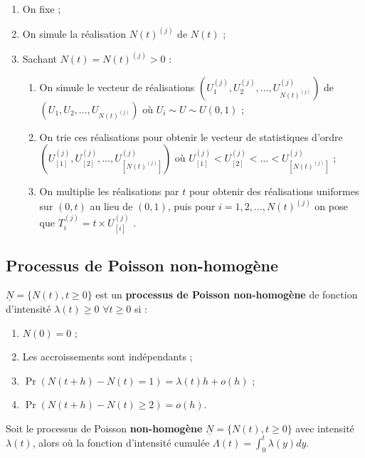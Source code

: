 \documentclass[10pt, french]{article}
\begin{document}
\begin{multicols*}{2}
\begin{algo2}
\begin{enumerate}
	\item	On fixe  ;
	\item	On simule la réalisation $N(t)^{(j)}$ de $N(t)$ ;
	\item	Sachant $N(t)	=	N(t)^{(j)}	>	0$ :
		\begin{enumerate}[label = \alph*)]
		\item	On simule le vecteur de réalisations $\left( U_{1}^{(j)}, U_{2}^{(j)}, \dots, U_{N(t)^{(j)}}^{(j)}\right)$ de $\left( U_{1}, U_{2}, \dots, U_{N(t)^{(j)}}\right)$ où $U_{i} \sim U \sim U(0, 1)$ ;
		\item	On trie ces réalisations pour obtenir le vecteur de statistiques d'ordre $\left( U_{[1]}^{(j)}, U_{[2]}^{(j)}, \dots, U_{[N(t)^{(j)}]}^{(j)}\right)$ où $ U_{[1]}^{(j)} < U_{[2]}^{(j)}< \dots < U_{[N(t)^{(j)}]}^{(j)}$ ;
		\item	On multiplie les réalisations par $t$ pour obtenir des réalisations uniformes sur $(0, t)$ au lieu de $(0, 1)$, puis pour $i	=	1, 2, \dots, N(t)^{(j)}$ on pose que $T_{i}^{(j)}	=	t \times U_{[i]}^{(j)}$ .
		\end{enumerate}
\end{enumerate}
\end{algo2}


\columnbreak
\subsection{Processus de Poisson non-homogène}
\begin{definitionNOHFILL}
$\underline{N}	=	\{N(t), t \geq 0\}$ est un \textbf{processus de Poisson non-homogène} de fonction d'intensité $\lambda(t)	\geq 0$ $\forall t \geq 0$ si :
\begin{enumerate}[label = \circled{\arabic*}{trueblue}]
	\item	$N(0)	=	0$ ;
	\item	Les accroissements sont indépendants ;
	\item	$\Pr(N(t + h) - N(t)	=	1)	=	\lambda(t)h + o(h)$ ;
	\item	$\Pr(N(t + h) - N(t)	\geq	2)	=	o(h)$.
\end{enumerate}
\end{definitionNOHFILL}

\begin{definitionNOHFILLsub}
Soit le processus de Poisson \textbf{non-homogène} $\underline{N}	=	\{N(t), t \geq 0\}$ avec intensité $\lambda(t)$, alors   où la fonction d'intensité cumulée $\Lambda(t)	=	\int_{0}^{t}\lambda(y)dy$.
\end{definitionNOHFILLsub}


\end{multicols*}
\end{document}
